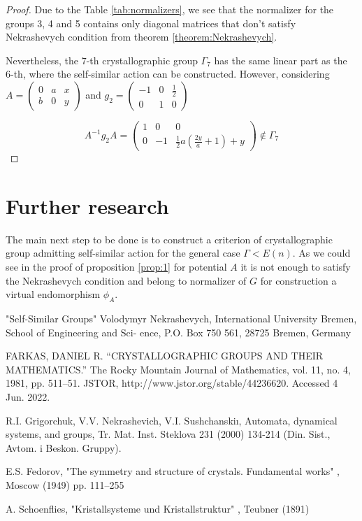 \documentclass[a4paper,12pt]{amsart}
\begin{document}
	\begin{proof}
		Due to the Table \ref{tab:normalizers}, we see that the normalizer for the groups 3, 4 and 5 contains only diagonal matrices that don't satisfy Nekrashevych condition from theorem \ref{theorem:Nekrashevych}. 
		
		Nevertheless, the 7-th crystallographic group $\Gamma_7$ has the same linear part as the 6-th, where the self-similar action can be constructed. However, considering $A = \left(\begin{array}{cc|c}
			0 & a & x \\ 
			b & 0 & y
		\end{array}\right)$ and $g_2 = \left(\begin{array}{cc|c}
		-1 & 0 & \frac{1}{2} \\ 
		0 & 1 & 0 
	\end{array}\right)$

	$$A^{-1} g_2 A = 
	\left(\begin{array}{cc|c}
		1 & 0 & 0 \\ 
		0 & -1 & \frac{1}{2} a ( \frac{2y}{a}+ 1) + y
	\end{array}\right) \notin \Gamma_7$$

	\end{proof}
	
	\section{Further research}
	
	The main next step to be done is to construct a criterion of crystallographic group admitting self-similar action for the general case $\Gamma < E(n)$. As we could see in the proof of proposition \ref{prop:1}  for potential $A$ it is not enough to satisfy the Nekrashevych condition and belong to normalizer of $G$ for construction a virtual endomorphism $\phi_A$. 
		
	\newpage 
	\begin{thebibliography}{9}
		
		 "Self-Similar Groups" Volodymyr Nekrashevych,
		International University Bremen, School of Engineering and Sci-
		ence, P.O. Box 750 561, 28725 Bremen, Germany
		
		FARKAS, DANIEL R. “CRYSTALLOGRAPHIC GROUPS AND THEIR MATHEMATICS.” The Rocky Mountain Journal of Mathematics, vol. 11, no. 4, 1981, pp. 511–51. JSTOR, http://www.jstor.org/stable/44236620. Accessed 4 Jun. 2022.
		
		R.I. Grigorchuk, V.V. Nekrashevich, V.I. Sushchanskiı, Automata, dynamical systems, and groups, Tr. Mat. Inst. Steklova 231 (2000) 134-214
		(Din. Sist., Avtom. i Beskon. Gruppy).
		
		  	E.S. Fedorov, "The symmetry and structure of crystals. Fundamental works" , Moscow (1949) pp. 111–255
		
		 A. Schoenflies, "Kristallsysteme und Kristallstruktur" , Teubner (1891)
		
	\end{thebibliography}
	
\end{document}
